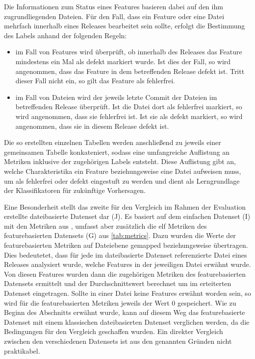 Die Informationen zum Status eines Features basieren dabei auf den ihm zugrundliegenden Dateien. Für den Fall, dass ein Feature oder eine Datei mehrfach innerhalb eines Releases bearbeitet sein sollte, erfolgt die Bestimmung des Labels anhand der folgenden Regeln:

\begin{itemize}
\setlength{\itemsep}{-2pt}
\item im Fall von Features wird überprüft, ob innerhalb des Releases das Feature mindestens ein Mal als \glqq defekt\grqq{} markiert wurde. Ist dies der Fall, so wird angenommen, dass das Feature in dem betreffenden Release defekt ist. Tritt dieser Fall nicht ein, so gilt das Feature als fehlerfrei.
\item im Fall von Dateien wird der jeweils letzte Commit der Dateien im betreffenden Release überprüft. Ist die Datei dort als \glqq fehlerfrei\grqq{} markiert, so wird angenommen, dass sie fehlerfrei ist. Ist sie als \glqq defekt\grqq{} markiert, so wird angenommen, dass sie in diesem Release defekt ist.
\end{itemize}

Die so erstellten einzelnen Tabellen werden anschließend zu jeweils einer gemeinsamen Tabelle konkateniert, sodass eine umfangreiche Auflistung an Metriken inklusive der zugehörigen Labels entsteht. Diese Auflistung gibt an, welche Charakteristika ein Feature beziehungsweise eine Datei aufweisen muss, um als \glqq fehlerfrei\grqq{} oder \glqq defekt\grqq{} eingestuft zu werden und dient als Lerngrundlage der Klassifikatoren für zukünftige Vorhersagen.

Eine Besonderheit stellt das zweite für den Vergleich im Rahmen der Evaluation erstellte dateibasierte Datenset dar (J). Es basiert auf dem \glqq einfachen\grqq{} Datenset (I) mit den Metriken aus \cite{Moser2008}, umfasst aber zusätzlich die elf Metriken des featurebasierten Datensets (G) aus \autoref{tab:metrics}. Dazu wurden die Werte der featurebasierten Metriken auf Dateiebene \glqq gemapped\grqq{} beziehungsweise übertragen. Dies bedeutetet, dass für jede im dateibasierte Datenset referenzierte Datei eines Releases analysiert wurde, welche Features in der jeweiligen Datei erwähnt wurde. Von diesen Features wurden dann die zugehörigen Metriken des featurebasierten Datensets ermittelt und der Durchschnittswert berechnet um im erteiterten Datenset eingetragen. Sollte in einer Datei keine Features erwähnt worden sein, so wird für die featurebasierten Metriken jeweils der Wert 0 gespeichert. Wie zu Beginn des Abschnitts erwähnt wurde, kann auf diesem Weg das featurebasierte Datenset mit einem klassischen dateibasierten Datenset verglichen werden, da die Bedingungen für den Vergleich geschaffen wurden. Ein direkter Vergleich zwischen den verschiedenen Datensets ist aus den genannten Gründen nicht praktikabel.

